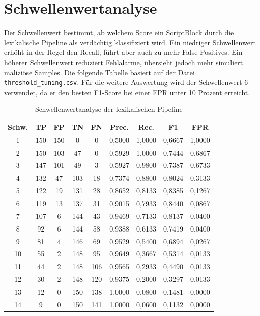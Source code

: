 \documentclass[12pt,a4paper,oneside,parskip=half]{scrreprt}
\begin{document}
\section{Schwellenwertanalyse}
Der Schwellenwert bestimmt, ab welchem Score ein ScriptBlock durch die lexikalische Pipeline als verdächtig klassifiziert wird. Ein niedriger Schwellenwert erhöht in der Regel den Recall, führt aber auch zu mehr False Positives. Ein höherer Schwellenwert reduziert Fehlalarme, übersieht jedoch mehr simuliert maliziöse Samples. Die folgende Tabelle basiert auf der Datei \texttt{threshold\_tuning.csv}. Für die weitere Auswertung wird der Schwellenwert 6 verwendet, da er den besten F1-Score bei einer FPR unter 10 Prozent erreicht.

\begin{table}[H]
\centering
\caption{Schwellenwertanalyse der lexikalischen Pipeline}
\begingroup
\small
\setlength{\tabcolsep}{3pt}
\begin{tabular}{|c|c|c|c|c|c|c|c|c|}
\hline
\textbf{Schw.} & \textbf{TP} & \textbf{FP} & \textbf{TN} & \textbf{FN} & \textbf{Prec.} & \textbf{Rec.} & \textbf{F1} & \textbf{FPR}\\
\hline
1 & 150 & 150 & 0 & 0 & 0{,}5000 & 1{,}0000 & 0{,}6667 & 1{,}0000\\
\hline
2 & 150 & 103 & 47 & 0 & 0{,}5929 & 1{,}0000 & 0{,}7444 & 0{,}6867\\
\hline
3 & 147 & 101 & 49 & 3 & 0{,}5927 & 0{,}9800 & 0{,}7387 & 0{,}6733\\
\hline
4 & 132 & 47 & 103 & 18 & 0{,}7374 & 0{,}8800 & 0{,}8024 & 0{,}3133\\
\hline
5 & 122 & 19 & 131 & 28 & 0{,}8652 & 0{,}8133 & 0{,}8385 & 0{,}1267\\
\hline
6 & 119 & 13 & 137 & 31 & 0{,}9015 & 0{,}7933 & 0{,}8440 & 0{,}0867\\
\hline
7 & 107 & 6 & 144 & 43 & 0{,}9469 & 0{,}7133 & 0{,}8137 & 0{,}0400\\
\hline
8 & 92 & 6 & 144 & 58 & 0{,}9388 & 0{,}6133 & 0{,}7419 & 0{,}0400\\
\hline
9 & 81 & 4 & 146 & 69 & 0{,}9529 & 0{,}5400 & 0{,}6894 & 0{,}0267\\
\hline
10 & 55 & 2 & 148 & 95 & 0{,}9649 & 0{,}3667 & 0{,}5314 & 0{,}0133\\
\hline
11 & 44 & 2 & 148 & 106 & 0{,}9565 & 0{,}2933 & 0{,}4490 & 0{,}0133\\
\hline
12 & 30 & 2 & 148 & 120 & 0{,}9375 & 0{,}2000 & 0{,}3297 & 0{,}0133\\
\hline
13 & 12 & 0 & 150 & 138 & 1{,}0000 & 0{,}0800 & 0{,}1481 & 0{,}0000\\
\hline
14 & 9 & 0 & 150 & 141 & 1{,}0000 & 0{,}0600 & 0{,}1132 & 0{,}0000\\
\hline
\end{tabular}
\endgroup
\end{table}
\end{document}
